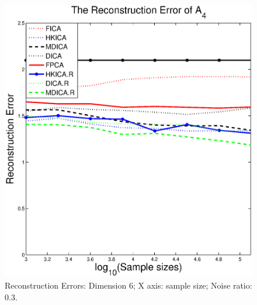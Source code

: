 \begin{figure}[t]
	\includegraphics[width =0.45\columnwidth]{images/error4_sample_noise3}
\caption{
\label{fig:Error_sample_noise3}
 Reconstruction Errors: Dimension 6; X axis: sample size; Noise ratio: 0.3.}
\end{figure}

